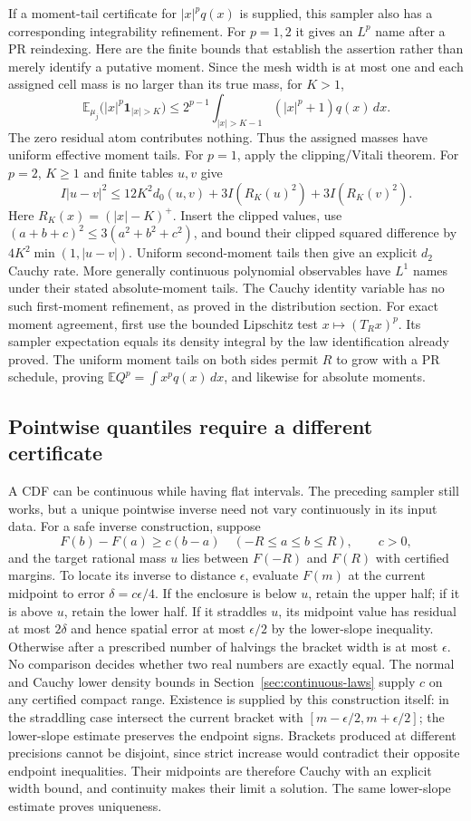 If a moment-tail certificate for $|x|^p q(x)$ is supplied, this sampler also
has a corresponding integrability refinement. For $p=1,2$ it gives an
$L^p$ name after a PR reindexing. Here are the finite bounds that establish
the assertion rather than merely identify a putative moment. Since the mesh
width is at most one and each assigned cell mass is no larger than its true
mass, for $K>1$,
\[
 \mathbb E_{\mu_j}\bigl(|x|^p\mathbf1_{|x|>K}\bigr)
 \le 2^{p-1}\int_{|x|>K-1}(|x|^p+1)q(x)\,dx.
\]
The zero residual atom contributes nothing. Thus the assigned masses have
uniform effective moment tails. For $p=1$, apply the clipping/Vitali theorem.
For $p=2$, $K\ge1$ and finite tables $u,v$ give
\[
 I|u-v|^2\le12K^2d_0(u,v)+3I(R_K(u)^2)+3I(R_K(v)^2).
\]
Here $R_K(x)=(|x|-K)^+$. Insert the clipped values, use
$(a+b+c)^2\le3(a^2+b^2+c^2)$, and bound their clipped squared difference
by $4K^2\min(1,|u-v|)$. Uniform second-moment tails then give an explicit
$d_2$ Cauchy rate. More generally continuous polynomial observables have
$L^1$ names under their stated absolute-moment tails. The Cauchy identity
variable has no such first-moment refinement, as proved in the distribution
section. For exact moment agreement, first use the bounded Lipschitz test
$x\mapsto(T_Rx)^p$. Its sampler expectation equals its density integral by
the law identification already proved. The uniform moment tails on both
sides permit $R$ to grow with a PR schedule, proving
$\mathbb E Q^p=\int x^p q(x)\,dx$, and likewise for absolute moments.

\subsection{Pointwise quantiles require a different certificate}

A CDF can be continuous while having flat intervals. The preceding sampler
still works, but a unique pointwise inverse need not vary continuously in
its input data. For a safe inverse construction, suppose
\[
 F(b)-F(a)\ge c(b-a)\quad(-R\le a\le b\le R),\qquad c>0,
\]
and the target rational mass $u$ lies between $F(-R)$ and $F(R)$ with
certified margins. To locate its inverse to distance $\epsilon$, evaluate
$F(m)$ at the current midpoint to error $\delta=c\epsilon/4$. If the
enclosure is below $u$, retain the upper half; if it is above $u$, retain
the lower half. If it straddles $u$, its midpoint value has residual at most
$2\delta$ and hence spatial error at most $\epsilon/2$ by the lower-slope
inequality. Otherwise after a prescribed number of halvings the bracket
width is at most $\epsilon$. No comparison decides whether two real
numbers are exactly equal. The normal and Cauchy lower density bounds in
Section~\ref{sec:continuous-laws} supply $c$ on any certified compact range.
Existence is supplied by this construction itself: in the straddling case
intersect the current bracket with $[m-\epsilon/2,m+\epsilon/2]$; the
lower-slope estimate preserves the endpoint signs. Brackets produced at
different precisions cannot be disjoint, since strict increase would
contradict their opposite endpoint inequalities. Their midpoints are
therefore Cauchy with an explicit width bound, and continuity makes their
limit a solution. The same lower-slope estimate proves uniqueness.

